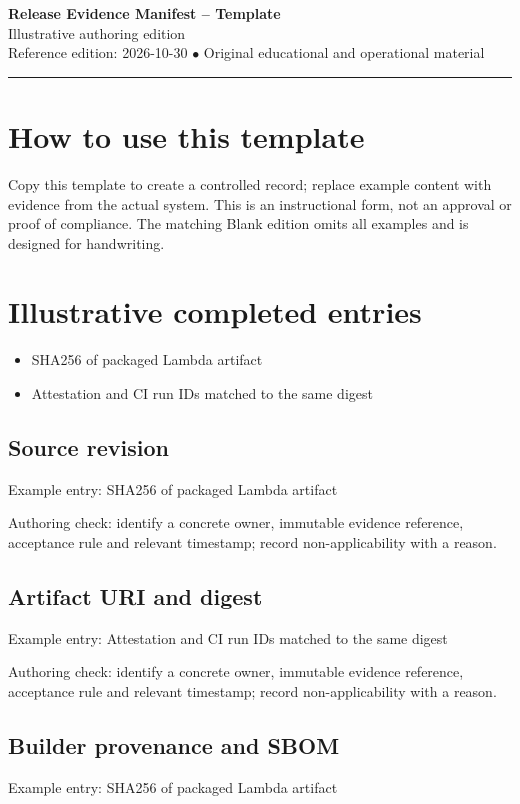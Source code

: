 \documentclass[10pt,letterpaper]{article}
\begin{document}
\begin{center}
{\LARGE\bfseries\color{cdblue}Release Evidence Manifest -- Template}\\[7pt]
{\large Illustrative authoring edition}\\[6pt]
{\small Reference edition: 2026-10-30 $\bullet$ Original educational and operational material}
\end{center}
\noindent\color{cdblue}\rule{\linewidth}{1.2pt}\color{black}
\vspace{0.4em}
\section{How to use this template}
Copy this template to create a controlled record; replace example content with evidence from the actual system. This is an instructional form, not an approval or proof of compliance. The matching Blank edition omits all examples and is designed for handwriting.


\section{Illustrative completed entries}
\begin{itemize}
\item SHA256 of packaged Lambda artifact
\item Attestation and CI run IDs matched to the same digest
\end{itemize}

\subsection{Source revision}
Example entry: SHA256 of packaged Lambda artifact

Authoring check: identify a concrete owner, immutable evidence reference, acceptance rule and relevant timestamp; record non-applicability with a reason.


\subsection{Artifact URI and digest}
Example entry: Attestation and CI run IDs matched to the same digest

Authoring check: identify a concrete owner, immutable evidence reference, acceptance rule and relevant timestamp; record non-applicability with a reason.


\subsection{Builder provenance and SBOM}
Example entry: SHA256 of packaged Lambda artifact
\end{document}
